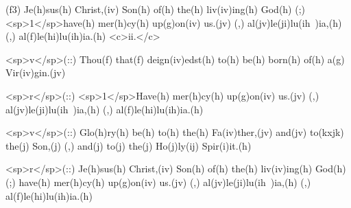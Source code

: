 (f3) Je(h)sus(h) Christ,(iv) Son(h) of(h) the(h) liv(iv)ing(h) God(h) (;) <sp>1</sp>have(h) mer(h)cy(h) up(g)on(iv) us.(jv) (,) al(jv)le(ji)lu(ih~)ia,(h) (,) al(f)le(hi)lu(ih)ia.(h) <c>ii.</c>

<sp>v</sp>(::) Thou(f) that(f) deign(iv)edst(h) to(h) be(h) born(h) of(h) a(g) Vir(iv)gin.(jv)

<sp>r</sp>(::) <sp>1</sp>Have(h) mer(h)cy(h) up(g)on(iv) us.(jv) (,) al(jv)le(ji)lu(ih~)ia,(h) (,) al(f)le(hi)lu(ih)ia.(h)

<sp>v</sp>(::)  Glo(h)ry(h) be(h) to(h) the(h) Fa(iv)ther,(jv) and(jv) to(kxjk) the(j) Son,(j) (,) and(j) to(j) the(j) Ho(j)ly(ij) Spir(i)it.(h)

<sp>r</sp>(::) Je(h)sus(h) Christ,(iv) Son(h) of(h) the(h) liv(iv)ing(h) God(h) (;) have(h) mer(h)cy(h) up(g)on(iv) us.(jv) (,) al(jv)le(ji)lu(ih~)ia,(h) (,) al(f)le(hi)lu(ih)ia.(h)